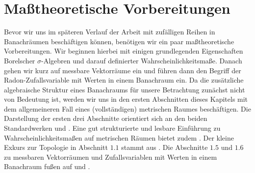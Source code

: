 \chapter{Ma\ss theoretische Vorbereitungen}
Bevor wir uns im späteren Verlauf der Arbeit mit zufälligen Reihen in Banachräumen beschäftigen können, benötigen wir ein paar maßtheoretische Vorbereitungen. 
Wir beginnen hierbei mit einigen grundlegenden Eigenschaften Borelscher $\sigma$-Algebren und darauf definierter Wahrscheinlichkeitsmaße. 
Danach gehen wir kurz auf messbare Vektorräume ein und führen dann den Begriff der Radon-Zufallsvariable mit Werten in einem Banachraum ein. 
Da die zusätzliche algebraische Struktur eines Banachraums für unsere Betrachtung zunächst nicht von Bedeutung ist, 
werden wir uns in den ersten Abschnitten dieses Kapitels mit dem allgemeineren Fall eines (vollständigen) metrischen Raumes beschäftigen. 
Die Darstellung der ersten drei Abschnitte orientiert sich an den beiden Standardwerken \cite{parthasarathy} und \cite{billingsley}. 
Eine gut strukturierte und lesbare Einführung zu Wahrscheinlichkeitsmaßen auf metrischen Räumen bietet zudem \cite{van-gaans}. 
Der kleine Exkurs zur Topologie in Abschnitt $1.1$ stammt aus \cite{preuss}. 
Die Abschnitte $1.5$ und $1.6$ zu messbaren Vektorräumen und Zufallsvariablen mit Werten in einem Banachraum fußen auf \cite{vakhania} und \cite{ledoux-talagrand}. 










